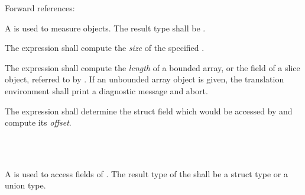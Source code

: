 \begin{grammar}
 \\
	 \\
	 \\
	 \\

 \\
	 \terminal{(}  \terminal{)} \\

 \\
	 \terminal{(}  \terminal{)} \\

 \\
	 \terminal{(}  \terminal{)} \\
\end{grammar}

Forward references: 

\specsubsubitem
A  is used to measure objects. The result
type shall be .

\specsubsubitem
The  expression shall compute the \textit{size} of the specified
.

\specsubsubitem
The  expression shall compute the \textit{length} of a bounded
array, or the  field of a slice object, referred to by
. If an unbounded array object is given, the
translation environment shall print a diagnostic message and abort.

\specsubsubitem
The  expression shall determine the struct field which would be
accessed by  and compute its
\textit{offset}.


\begin{grammar}
 \\
	   \\
\end{grammar}

\specsubitem
A  is used to access fields of
. The result type of the
 shall be a struct type or a union type.

